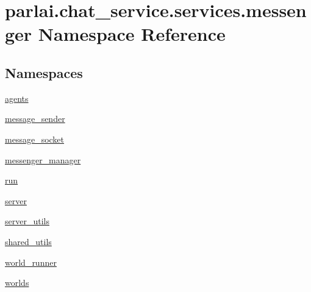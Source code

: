\hypertarget{namespaceparlai_1_1chat__service_1_1services_1_1messenger}{}\section{parlai.\+chat\+\_\+service.\+services.\+messenger Namespace Reference}
\label{namespaceparlai_1_1chat__service_1_1services_1_1messenger}
\subsection*{Namespaces}
\begin{DoxyCompactItemize}
\item 
 \hyperlink{namespaceparlai_1_1chat__service_1_1services_1_1messenger_1_1agents}{agents}
\item 
 \hyperlink{namespaceparlai_1_1chat__service_1_1services_1_1messenger_1_1message__sender}{message\+\_\+sender}
\item 
 \hyperlink{namespaceparlai_1_1chat__service_1_1services_1_1messenger_1_1message__socket}{message\+\_\+socket}
\item 
 \hyperlink{namespaceparlai_1_1chat__service_1_1services_1_1messenger_1_1messenger__manager}{messenger\+\_\+manager}
\item 
 \hyperlink{namespaceparlai_1_1chat__service_1_1services_1_1messenger_1_1run}{run}
\item 
 \hyperlink{namespaceparlai_1_1chat__service_1_1services_1_1messenger_1_1server}{server}
\item 
 \hyperlink{namespaceparlai_1_1chat__service_1_1services_1_1messenger_1_1server__utils}{server\+\_\+utils}
\item 
 \hyperlink{namespaceparlai_1_1chat__service_1_1services_1_1messenger_1_1shared__utils}{shared\+\_\+utils}
\item 
 \hyperlink{namespaceparlai_1_1chat__service_1_1services_1_1messenger_1_1world__runner}{world\+\_\+runner}
\item 
 \hyperlink{namespaceparlai_1_1chat__service_1_1services_1_1messenger_1_1worlds}{worlds}
\end{DoxyCompactItemize}

